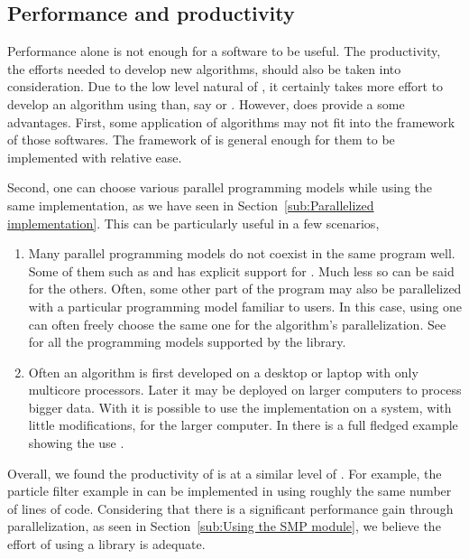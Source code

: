 \subsection{Performance and productivity}
\label{sub:Performance and productivity}

Performance alone is not enough for a software to be useful. The productivity, the efforts needed to develop new algorithms, should also be taken into consideration. Due to the low level natural of \cpp, it certainly takes more effort to develop an algorithm using \vsmc than, say \libbi or \biips. However, \smc does provide a some advantages. First, some application of \smc algorithms may not fit into the framework of those softwares. The framework of \smc is general enough for them to be implemented with relative ease.

Second, one can choose various parallel programming models while using the same implementation, as we have seen in Section~\ref{sub:Parallelized implementation}. This can be particularly useful in a few scenarios,
\begin{enumerate}
  \item Many parallel programming models do not coexist in the same program well. Some of them such as \tbb and \cilk has explicit support for \openmp. Much less so can be said for the others. Often, some other part of the program may also be parallelized with a particular programming model familiar to users. In this case, using \vsmc one can often freely choose the same one for the \smc algorithm's parallelization. See \cite{vsmcjss} for all the programming models supported by the library.
  \item Often an algorithm is first developed on a desktop or laptop with only multicore processors. Later it may be deployed on larger computers to process bigger data. With \vsmc it is possible to use the implementation on a \smp system, with little modifications, for the larger computer. In \cite{vsmcjss} there is a full fledged example showing the use \mpi.
\end{enumerate}

Overall, we found the productivity of \vsmc is at a similar level of \smctc. For example, the particle filter example in \cite{smctc} can be implemented in \vsmc using roughly the same number of lines of code. Considering that there is a significant performance gain through parallelization, as seen in Section~\ref{sub:Using the SMP module}, we believe the effort of using a \cpp library is adequate.

